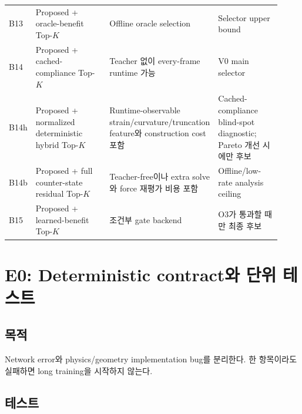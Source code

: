 \documentclass[11pt,a4paper]{article}
\begin{document}
\begin{longtable}{L{0.08\linewidth}L{0.30\linewidth}L{0.29\linewidth}L{0.25\linewidth}}
\addlinespace
B13 & Proposed + oracle-benefit Top-\(K\) & Offline oracle selection & Selector upper bound \\
\addlinespace
B14 & Proposed + cached-compliance Top-\(K\) & Teacher 없이 every-frame runtime 가능 & V0 main selector \\
\addlinespace
B14h & Proposed + normalized deterministic hybrid Top-\(K\) & Runtime-observable strain/curvature/truncation feature와 construction cost 포함 & Cached-compliance blind-spot diagnostic; Pareto 개선 시에만 후보 \\
\addlinespace
B14b & Proposed + full counter-state residual Top-\(K\) & Teacher-free이나 extra solve와 force 재평가 비용 포함 & Offline/low-rate analysis ceiling \\
\addlinespace
B15 & Proposed + learned-benefit Top-\(K\) & 조건부 gate backend & O3가 통과할 때만 최종 후보 \\
\bottomrule
\end{longtable}

\section{E0: Deterministic contract와 단위 테스트}

\subsection*{목적}

Network error와 physics/geometry implementation bug를 분리한다.
한 항목이라도 실패하면 long training을 시작하지 않는다.

\subsection*{테스트}
\end{document}
